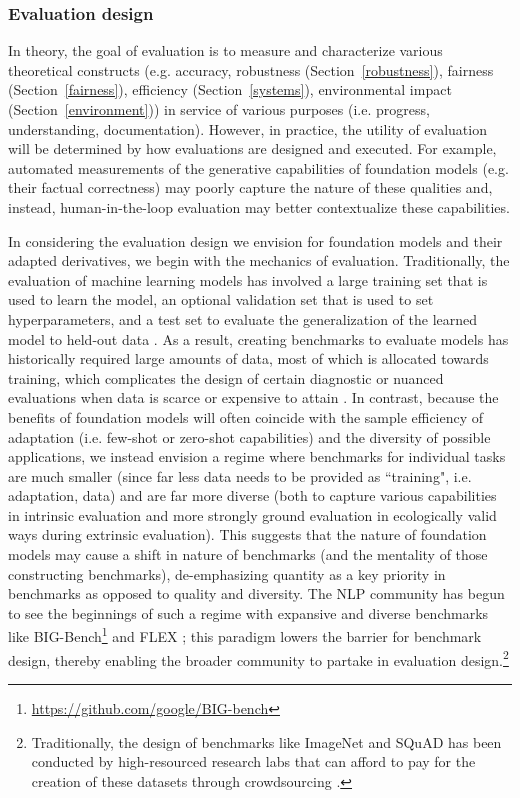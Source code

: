 \subsubsection{Evaluation design}
\label{sec:evaluation-design}

In theory, the goal of evaluation is to measure and characterize various theoretical constructs (e.g. accuracy, robustness (Section~\ref{robustness}), fairness (Section~\ref{fairness}), efficiency (Section~\ref{systems}), environmental impact (Section~\ref{environment})) in service of various purposes (i.e. progress, understanding, documentation). However, in practice, the utility of evaluation will be determined by how evaluations are designed and executed. For example, automated measurements of the generative capabilities of foundation models (e.g. their factual correctness) may poorly capture the nature of these qualities and, instead, human-in-the-loop evaluation may better contextualize these capabilities. 

In considering the evaluation design we envision for foundation models and their adapted derivatives, we begin with the mechanics of evaluation. Traditionally, the evaluation of machine learning models has involved a large training set that is used to learn the model, an optional validation set that is used to set hyperparameters, and a test set to evaluate the generalization of the learned model to held-out data \citep{bishop2006}. As a result, creating benchmarks to evaluate models has historically required large amounts of data, most of which is allocated towards training, which complicates the design of certain diagnostic or nuanced evaluations when data is scarce or expensive to attain \citep{rogers2020, rogers2021}. In contrast, because the benefits of foundation models will often coincide with the sample efficiency of adaptation (i.e. few-shot or zero-shot capabilities) and the diversity of possible applications, we instead envision a regime where benchmarks for individual tasks are much smaller (since far less data needs to be provided as ``training", i.e. adaptation, data) and are far more diverse (both to capture various capabilities in intrinsic evaluation and more strongly ground evaluation in ecologically valid ways \citep{brofenbrenner1977, vries2020ecological} during extrinsic evaluation). This suggests that the nature of foundation models may cause a shift in nature of benchmarks (and the mentality of those constructing benchmarks), de-emphasizing quantity as a key priority in benchmarks as opposed to quality and diversity. The NLP community has begun to see the beginnings of such a regime with expansive and diverse benchmarks like BIG-Bench\footnote{\url{https://github.com/google/BIG-bench}} and FLEX \citep{bragg2021}; this paradigm lowers the barrier for benchmark design, thereby enabling the broader community to partake in evaluation design.\footnote{Traditionally, the design of benchmarks like ImageNet \citep{deng2009imagenet} and SQuAD \citep{rajpurkar2016squad} has been conducted by high-resourced research labs that can afford to pay for the creation of these datasets through crowdsourcing \citep{rogers2020}.} 

